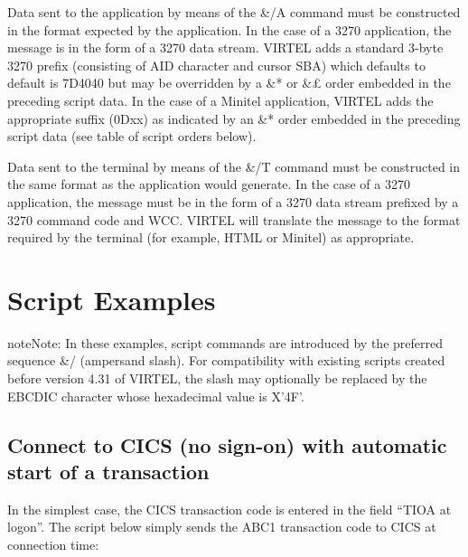 \documentclass[letterpaper,10pt,english]{sphinxmanual}
\begin{document}
Data sent to the application by means of the \&/A command must be constructed in the format expected by the application. In the case of a 3270 application, the message is in the form of a 3270 data stream. VIRTEL adds a standard 3-byte 3270 prefix (consisting of AID character and cursor SBA) which defaults to default is 7D4040 but may be overridden by a \&* or \&£ order embedded in the preceding script data. In the case of a Minitel application, VIRTEL adds the appropriate suffix (0Dxx) as indicated by an \&* order embedded in the preceding script data (see table of script orders below).

Data sent to the terminal by means of the \&/T command must be constructed in the same format as the application would generate. In the case of a 3270 application, the message must be in the form of a 3270 data stream prefixed by a 3270 command code and WCC. VIRTEL will translate the message to the format required by the terminal (for example, HTML or Minitel) as appropriate.


\section{Script Examples}
\label{\detokenize{connectivity_guide:script-examples}}\label{\detokenize{connectivity_guide:index-122}}
\begin{sphinxadmonition}{note}{Note:}
In these examples, script commands are introduced by the preferred sequence \&/ (ampersand slash). For compatibility with existing scripts created before version 4.31 of VIRTEL, the slash may optionally be replaced by the EBCDIC character whose hexadecimal value is X’4F’.
\end{sphinxadmonition}


\subsection{Connect to CICS (no sign-on) with automatic start of a transaction}
\label{\detokenize{connectivity_guide:connect-to-cics-no-sign-on-with-automatic-start-of-a-transaction}}\label{\detokenize{connectivity_guide:index-123}}
In the simplest case, the CICS transaction code is entered in the field “TIOA at logon”. The script below simply sends the ABC1 transaction code to CICS at connection time:
\end{document}
